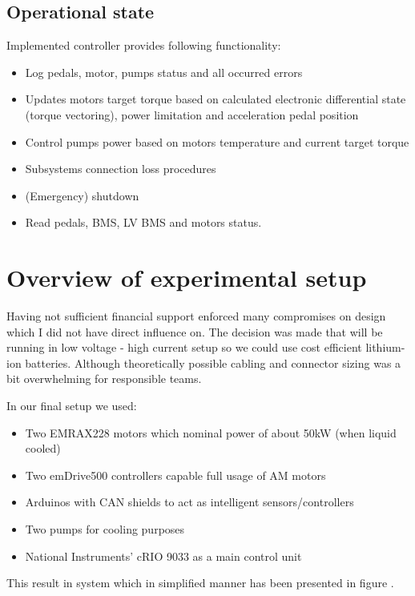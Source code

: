 \subsection{Operational state}
Implemented controller provides following functionality:
\begin{itemize}
    \item Log pedals, motor, pumps status and all occurred errors
    \item Updates motors target torque based on calculated electronic differential state (torque vectoring), power limitation and acceleration pedal position
    \item Control pumps power based on motors temperature and current target torque
    \item Subsystems connection loss procedures
    \item (Emergency) shutdown
    \item Read pedals, BMS, LV BMS and motors status.
\end{itemize}


\section{Overview of experimental setup}
Having not sufficient financial support enforced many compromises on design which I did not have direct influence on. The decision was made that will be running in low voltage - high current setup so we could use cost efficient lithium-ion batteries. 
Although theoretically possible cabling and connector sizing was a bit overwhelming for responsible teams.

In our final setup we used:
\begin{itemize}
    \item Two EMRAX228 motors which nominal power of about 50kW (when liquid cooled)
    \item Two emDrive500 controllers capable full usage of AM motors
    \item Arduinos with CAN shields to act as intelligent sensors/controllers
    \item Two  pumps for cooling purposes
    \item National Instruments' cRIO 9033 as a main control unit
\end{itemize}

This result in system which in simplified manner has been presented in figure .


